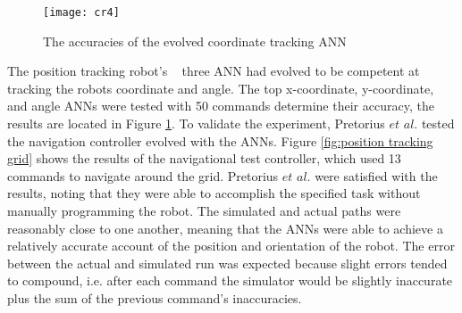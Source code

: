 \documentclass{sig-alternate}
\begin{document}
\begin{figure}%
\center
\caption{The accuracies of the evolved coordinate tracking ANN}

  \texttt{[image: cr4]}
\label{fig:ANNtable}
\end{figure}
	The  position tracking robot's ~\cite{Pretorius:2009:TAN:1632149.1632171} three ANN had evolved to be competent at tracking the robots coordinate and angle. The top x-coordinate, y-coordinate, and angle ANNs were tested with 50 commands determine their accuracy, the results are located in Figure \ref{fig:ANNtable}. To validate the experiment, Pretorius $et$ $al.$ tested the navigation controller evolved with the ANNs. Figure \ref{fig:position tracking grid} shows the results of the navigational test controller, which used 13 commands to navigate around the grid. Pretorius $et$ $al.$ were satisfied with the results, noting that they were able to accomplish the specified task without  manually programming the robot. The simulated and actual paths were reasonably close to one another, meaning that the ANNs were able to achieve a relatively accurate account of the position and orientation of the robot. The error between the actual and simulated run was expected because slight errors tended to compound, i.e. after each command the simulator would be slightly inaccurate plus the sum of the previous command's inaccuracies. 
	
\end{document}
